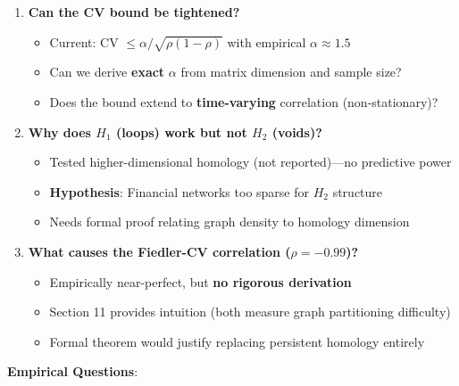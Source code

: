 \begin{enumerate}
\item \textbf{Can the CV bound be tightened?}
   \begin{itemize}
   \item Current: CV $\leq \alpha/\sqrt{\rho(1-\rho)}$ with empirical $\alpha \approx 1.5$
   \item Can we derive \textbf{exact} $\alpha$ from matrix dimension and sample size?
   \item Does the bound extend to \textbf{time-varying} correlation (non-stationary)?
   \end{itemize}

\item \textbf{Why does $H_1$ (loops) work but not $H_2$ (voids)?}
   \begin{itemize}
   \item Tested higher-dimensional homology (not reported)---no predictive power
   \item \textbf{Hypothesis}: Financial networks too sparse for $H_2$ structure
   \item Needs formal proof relating graph density to homology dimension
   \end{itemize}

\item \textbf{What causes the Fiedler-CV correlation ($\rho = -0.99$)?}
   \begin{itemize}
   \item Empirically near-perfect, but \textbf{no rigorous derivation}
   \item Section 11 provides intuition (both measure graph partitioning difficulty)
   \item Formal theorem would justify replacing persistent homology entirely
   \end{itemize}
\end{enumerate}

\textbf{Empirical Questions}:

